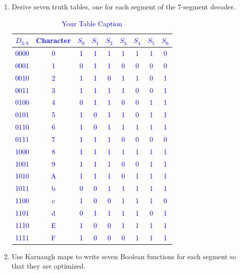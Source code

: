 \documentclass{article}
\begin{document}
\begin{enumerate}
\item Derive seven truth tables, one for each segment of the 7-segment decoder.

\begin{table}[ht!]
\small
\centering
\textcolor{blue}{%
\begin{tabular}{c|c|ccccccc}
$D_{3:0}$ & Character & $S_0$ & $S_1$ & $S_2$ & $S_3$ & $S_4$ & $S_5$ & $S_6$\\
\hline
0000 & 0 & 1 & 1 & 1 & 1 & 1 & 1 & 0 \\
0001 & 1 & 0 & 1 & 1 & 0 & 0 & 0 & 0 \\
0010 & 2 & 1 & 1 & 0 & 1 & 1 & 0 & 1 \\
0011 & 3 & 1 & 1 & 1 & 1 & 0 & 0 & 1 \\
0100 & 4 & 0 & 1 & 1 & 0 & 0 & 1 & 1 \\
0101 & 5 & 1 & 0 & 1 & 1 & 0 & 1 & 1 \\
0110 & 6 & 1 & 0 & 1 & 1 & 1 & 1 & 1 \\
0111 & 7 & 1 & 1 & 1 & 0 & 0 & 0 & 0 \\
1000 & 8 & 1 & 1 & 1 & 1 & 1 & 1 & 1 \\
1001 & 9 & 1 & 1 & 1 & 0 & 0 & 1 & 1 \\
1010 & A & 1 & 1 & 1 & 0 & 1 & 1 & 1 \\
1011 & b & 0 & 0 & 1 & 1 & 1 & 1 & 1 \\
1100 & c & 1 & 0 & 0 & 1 & 1 & 1 & 0 \\
1101 & d & 0 & 1 & 1 & 1 & 1 & 0 & 1 \\
1110 & E & 1 & 0 & 0 & 1 & 1 & 1 & 1 \\
1111 & F & 1 & 0 & 0 & 0 & 1 & 1 & 1 \\
\end{tabular}%
}
\caption{Your Table Caption}
\label{tab:your_table_label}
\end{table}

\item Use Karnaugh maps to write seven Boolean functions for each segment so that they are optimized.



\end{enumerate}
\end{document}
